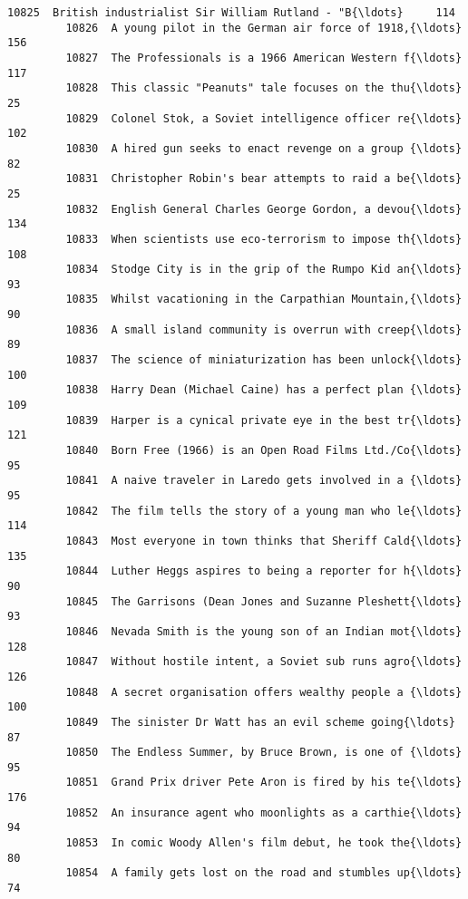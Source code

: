 \documentclass[11pt]{article}
\begin{document}
\begin{Verbatim}[commandchars=\\\{\}]
         10825  British industrialist Sir William Rutland - "B{\ldots}     114   
         10826  A young pilot in the German air force of 1918,{\ldots}     156   
         10827  The Professionals is a 1966 American Western f{\ldots}     117   
         10828  This classic "Peanuts" tale focuses on the thu{\ldots}      25   
         10829  Colonel Stok, a Soviet intelligence officer re{\ldots}     102   
         10830  A hired gun seeks to enact revenge on a group {\ldots}      82   
         10831  Christopher Robin's bear attempts to raid a be{\ldots}      25   
         10832  English General Charles George Gordon, a devou{\ldots}     134   
         10833  When scientists use eco-terrorism to impose th{\ldots}     108   
         10834  Stodge City is in the grip of the Rumpo Kid an{\ldots}      93   
         10835  Whilst vacationing in the Carpathian Mountain,{\ldots}      90   
         10836  A small island community is overrun with creep{\ldots}      89   
         10837  The science of miniaturization has been unlock{\ldots}     100   
         10838  Harry Dean (Michael Caine) has a perfect plan {\ldots}     109   
         10839  Harper is a cynical private eye in the best tr{\ldots}     121   
         10840  Born Free (1966) is an Open Road Films Ltd./Co{\ldots}      95   
         10841  A naive traveler in Laredo gets involved in a {\ldots}      95   
         10842  The film tells the story of a young man who le{\ldots}     114   
         10843  Most everyone in town thinks that Sheriff Cald{\ldots}     135   
         10844  Luther Heggs aspires to being a reporter for h{\ldots}      90   
         10845  The Garrisons (Dean Jones and Suzanne Pleshett{\ldots}      93   
         10846  Nevada Smith is the young son of an Indian mot{\ldots}     128   
         10847  Without hostile intent, a Soviet sub runs agro{\ldots}     126   
         10848  A secret organisation offers wealthy people a {\ldots}     100   
         10849  The sinister Dr Watt has an evil scheme going{\ldots}      87   
         10850  The Endless Summer, by Bruce Brown, is one of {\ldots}      95   
         10851  Grand Prix driver Pete Aron is fired by his te{\ldots}     176   
         10852  An insurance agent who moonlights as a carthie{\ldots}      94   
         10853  In comic Woody Allen's film debut, he took the{\ldots}      80   
         10854  A family gets lost on the road and stumbles up{\ldots}      74   
         

\end{Verbatim}
\end{document}
